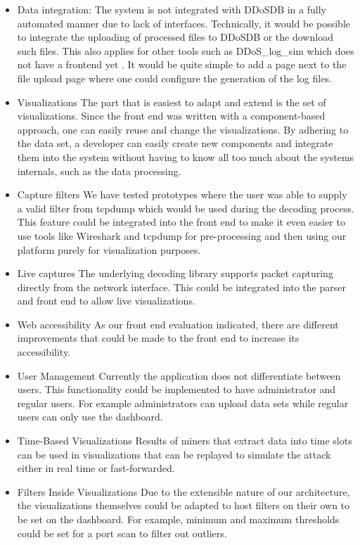 \begin{itemize}
    \item Data integration:
    The system is not integrated with DDoSDB in a fully automated manner due to lack of interfaces. Technically, it would be possible to integrate the uploading  of processed files to DDoSDB or the download such files.
    This also applies for other tools such as DDoS\_log\_sim which does not have a frontend yet \cite{ddoslogsim}. It would be quite simple to add a page next to the file upload page where one could configure the generation of the log files.
    
    \item Visualizations
    The part that is easiest to adapt and extend is the set of visualizations. Since the front end was written with a component-based approach, one can easily reuse and change the visualizations. By adhering to the data set, a developer can easily create new components and integrate them into the system without having to know all too much about the systems internals, such as the data processing.
    
    \item Capture filters
    We have tested prototypes where the user was able to supply a valid filter from tcpdump which would be used during the decoding process. This feature could be integrated into the front end to make it even easier to use tools like Wireshark and tcpdump for pre-processing and then using our platform purely for visualization purposes.
    
    \item Live captures
    The underlying decoding library supports packet capturing directly from the network interface. This could be integrated into the parser and front end to allow live visualizations.
    
    \item Web accessibility
    As our front end evaluation indicated, there are different improvements that could be made to the front end to increase its accessibility.
    
    \item User Management
    Currently the application does not differentiate between users. This functionality could be implemented to have administrator and regular users. For example administrators can upload data sets while regular users can only use the dashboard.
    
    \item Time-Based Visualizations
    Results of miners that extract data into time slots can be used in visualizations that can be replayed to simulate the attack either in real time or fast-forwarded.
    
    \item Filters Inside Visualizations
    Due to the extensible nature of our architecture, the visualizations themselves could be adapted to host filters on their own to be set on the dashboard. For example, minimum and maximum thresholds could be set for a port scan to filter out outliers.
    
\end{itemize}
